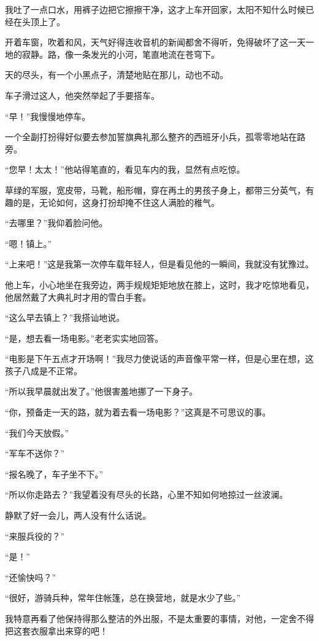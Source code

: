 \par 我吐了一点口水，用裤子边把它擦擦干净，这才上车开回家，太阳不知什么时候已经在头顶上了。
\par 开着车窗，吹着和风，天气好得连收音机的新闻都舍不得听，免得破坏了这一天一地的寂静。路，像一条发光的小河，笔直地流在苍穹下。
\par 天的尽头，有一个小黑点子，清楚地贴在那儿，动也不动。
\par 车子滑过这人，他突然举起了手要搭车。
\par “早！”我慢慢地停车。
\par 一个全副打扮得好似要去参加誓旗典礼那么整齐的西班牙小兵，孤零零地站在路旁。
\par “您早！太太！”他站得笔直的，看见车内的我，显然有点吃惊。
\par 草绿的军服，宽皮带，马靴，船形帽，穿在再土的男孩子身上，都带三分英气，有趣的是，无论如何，这身打扮却掩不住这人满脸的稚气。
\par “去哪里？”我仰着脸问他。
\par “嗯！镇上。”
\par “上来吧！”这是我第一次停车载年轻人，但是看见他的一瞬间，我就没有犹豫过。
\par 他上车，小心地坐在我旁边，两手规规矩矩地放在膝上，这时，我才吃惊地看见，他居然戴了大典礼时才用的雪白手套。
\par “这么早去镇上？”我搭讪地说。
\par “是，想去看一场电影。”老老实实地回答。
\par “电影是下午五点才开场啊！”我尽力使说话的声音像平常一样，但是心里在想，这孩子八成是不正常。
\par “所以我早晨就出发了。”他很害羞地挪了一下身子。
\par “你，预备走一天的路，就为着去看一场电影？”这真是不可思议的事。
\par “我们今天放假。”
\par “军车不送你？”
\par “报名晚了，车子坐不下。”
\par “所以你走路去？”我望着没有尽头的长路，心里不知如何地掠过一丝波澜。
\par 静默了好一会儿，两人没有什么话说。
\par “来服兵役的？”
\par “是！”
\par “还愉快吗？”
\par “很好，游骑兵种，常年住帐篷，总在换营地，就是水少了些。”
\par 我特意再看了他保持得那么整洁的外出服，不是太重要的事情，对他，一定舍不得把这套衣服拿出来穿的吧！
